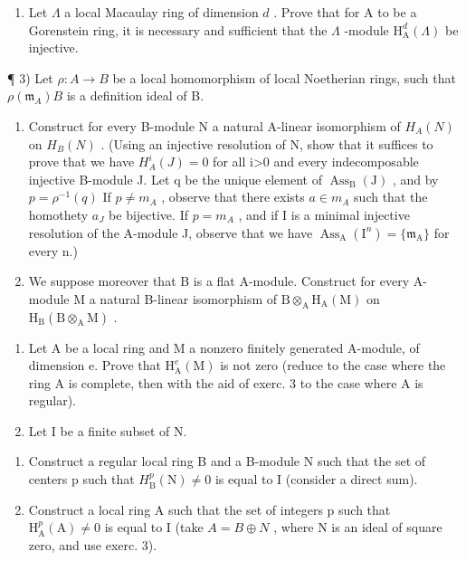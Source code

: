 \begin{enumerate}
\def\labelenumi{\arabic{enumi})}
\setcounter{enumi}{1}
\tightlist
\item
  Let \(\Lambda\) a local Macaulay ring of dimension \(d\) . Prove that for A to be a Gorenstein ring, it is necessary and sufficient that the \(\Lambda\) -module \(\mathrm{H}_{\mathrm{A}}^{d}(\Lambda)\) be injective.
\end{enumerate}

¶ 3) Let \(\rho: A \to B\) be a local homomorphism of local Noetherian rings, such that \(\rho(\mathfrak{m}_{A})B\) is a definition ideal of B.

\begin{enumerate}
\def\labelenumi{\alph{enumi})}
\item
  Construct for every B-module N a natural A-linear isomorphism of \(H_{A}(N)\) on \(H_{B}(N)\) . (Using an injective resolution of N, show that it suffices to prove that we have \(H_{A}^{i}(J)=0\) for all i\textgreater0 and every indecomposable injective B-module J. Let q be the unique element of \(\operatorname{Ass}_{\mathrm{B}}(\mathrm{J})\) , and by \(p=\rho^{-1}(q)\) If \(p\neq m_{A}\) , observe that there exists \(a\in m_{A}\) such that the homothety \(a_{J}\) be bijective. If \(p=m_{A}\) , and if I is a minimal injective resolution of the A-module J, observe that we have \(\operatorname{Ass}_{\mathrm{A}}(\mathrm{I}^{n})=\{\mathfrak{m}_{\mathrm{A}}\}\) for every n.)
\item
  We suppose moreover that B is a flat A-module. Construct for every A-module M a natural B-linear isomorphism of \(\mathrm{B}\otimes_{\mathrm{A}}\mathrm{H}_{\mathrm{A}}(\mathrm{M})\) on \(\mathrm{H}_{\mathrm{B}}(\mathrm{B}\otimes_{\mathrm{A}}\mathrm{M})\) .
\end{enumerate}

\begin{enumerate}
\def\labelenumi{\arabic{enumi})}
\setcounter{enumi}{3}
\item
  Let A be a local ring and M a nonzero finitely generated A-module, of dimension e. Prove that \(\mathrm{H}_{\mathrm{A}}^{e}(\mathrm{M})\) is not zero (reduce to the case where the ring A is complete, then with the aid of exerc. 3 to the case where A is regular).
\item
  Let I be a finite subset of N.
\end{enumerate}

\begin{enumerate}
\def\labelenumi{\alph{enumi})}
\item
  Construct a regular local ring B and a B-module N such that the set of centers p such that \(H_{\mathrm{B}}^{p}(\mathrm{N}) \neq 0\) is equal to I (consider a direct sum).
\item
  Construct a local ring A such that the set of integers p such that \(\mathrm{H}_{\mathrm{A}}^{p}(\mathrm{A}) \neq 0\) is equal to I (take \(A = B \oplus N\) , where N is an ideal of square zero, and use exerc. 3).
\end{enumerate}

